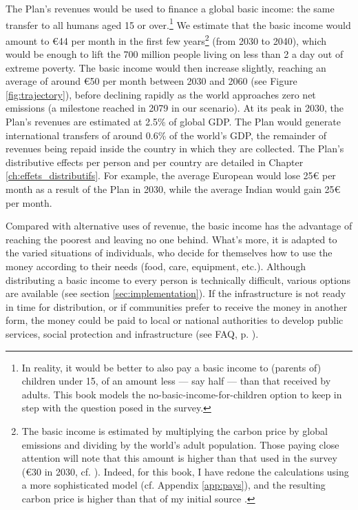 \documentclass[a5paper,english,openany]{memoir}
\begin{document}
The Plan's revenues would be used to finance a global basic income: the same transfer to all humans aged 15 or over.\footnote{In reality, it would be better to also pay a basic income to (parents of) children under 15, of an amount less --- say half --- than that received by adults. This book models the no-basic-income-for-children option to keep in step with the question posed in the survey.
} 
We estimate that the basic income would amount to \euro{}44 per month in the first few years\footnote{The basic income is estimated by multiplying the carbon price by global emissions and dividing by the world's adult population. Those paying close attention will note that this amount is higher than that used in the survey (\euro{}30 in 2030, cf. \citealp{fabre_global_2023}). Indeed, for this book, I have redone the calculations using a more sophisticated model (cf. Appendix \ref{app:pays}), and the resulting carbon price is higher than that of my initial source \citep{stern_report_2017}.} (from 2030 to 2040), which would be enough to lift the 700 million people living on less than \textit{\texteuro{}}2 a day out of extreme poverty. 
The basic income would then increase slightly, reaching an average of around \euro{}50 per month between 2030 and 2060 (see Figure \ref{fig:trajectory}), before declining rapidly as the world approaches zero net emissions (a milestone reached in 2079 in our scenario). 
At its peak in 2030, the Plan's revenues are estimated at 2.5\% of global GDP. The Plan would generate international transfers of around 0.6\% %
of the world's GDP, the remainder %
of revenues being repaid inside the country in which they are collected. 
The Plan's distributive effects per person and per country are detailed in Chapter \ref{ch:effets_distributifs}. 
For example, the average European %
would lose 25\euro{} per month as a result of the Plan in 2030, while the average Indian would gain 25\euro{} per month. %

Compared with alternative uses of revenue, the basic income has the advantage of reaching the poorest and leaving no one behind. What's more, it is adapted to the varied situations of individuals, who decide for themselves how to use the money according to their needs (food, care, equipment, etc.). 
Although distributing a basic income to every person is technically difficult, various options are available %
(see section \ref{sec:implementation}). If the infrastructure is not ready in time for distribution, or if communities prefer to receive the money in another form, the money could be paid to local or national authorities to develop public services, social protection and infrastructure (see FAQ, p. \pageref{q:rdb}). 
\end{document}
